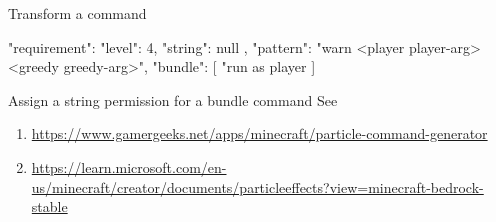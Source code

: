 \begin{example}{Transform a command}
    \begin{jsoncode}
    {
        "requirement": {
        "level": 4,
        "string": null
    },
        "pattern": "warn <player player-arg> <greedy greedy-arg>",
        "bundle": [
        "run as player %
        ]
    }
    \end{jsoncode}
\end{example}

\begin{tips}{Assign a string permission for a bundle command}
    See~
\end{tips}


\begin{enumerate}
    \item \url{https://www.gamergeeks.net/apps/minecraft/particle-command-generator}
    \item \url{https://learn.microsoft.com/en-us/minecraft/creator/documents/particleeffects?view=minecraft-bedrock-stable}
\end{enumerate}
